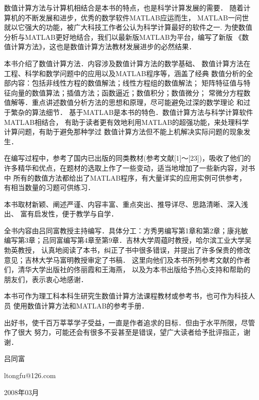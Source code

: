  \vspace*{0.0cm}
\thispagestyle{empty}
\vspace*{2.2cm}
\centerline{\hei{\color{darkblue}{第一版前言}}}\vspace{2cm}

数值计算方法与计算机相结合是本书的特点，也是科学计算发展的需要．
随着计算机的不断发展和进步，优秀的数学软件MATLAB应运而生，
MATLAB一问世就以它强大的功能，被广大科技工作者公认为科学计算最好的软件之一.
为使数值分析与MATLAB更好地结合，我们以最新版MATLAB为平台，编写了新版
《数值计算方法》，这也是数值计算方法教材发展进步的必然结果．

本书介绍了数值计算方法．内容涉及数值计算方法的数学基础、
数值计算方法在工程、科学和数学问题中的应用以及MATLAB程序等，涵盖了经典
数值分析的全部内容：包括非线性方程的数值解法；线性方程组的数值解法；
矩阵特征值与特征向量的数值算法；插值方法；函数逼近；数值积分；数值微分；
常微分方程数值解等．重点讲述数值分析方法的思想和原理，尽可能避免过深的数学理论
和过于繁杂的算法细节．
基于MATLAB是本书的特色．数值计算方法与科学计算软件MATLAB相结合，
有助于读者更有效地利用MATLAB的超强功能，来处理科学计算问题，有助于避免那种学过
数值计算方法但不能上机解决实际问题的现象发生．

在编写过程中，参考了国内已出版的同类教材(参考文献[1]～[23])，吸收了他们的
许多精华和优点，在题材的选取上作了一些变动，适当地增加了一些新内容，对书中
所有的数值方法都给出了MATLAB程序，有大量详实的应用实例可供参考，
有相当数量的习题可供练习．

本书取材新颖、阐述严谨、内容丰富、重点突出、推导详尽、思路清晰、深入浅出、
富有启发性，便于教学与自学．

全书内容由吕同富教授主持编写．具体分工：方秀男编写第1章和第2章；康兆敏
编写第3章；吕同富编写第4章至第9章．吉林大学周蕴时教授，哈尔滨工业大学吴勃英教授，
认真地阅读了本书，纠正了书中很多错误，并提出了许多保贵的修改意见；吉林大学马富明教授审定了书稿．
这里向他们及本书所列参考文献的作者们，清华大学出版社的佟丽霞和王海燕，
以及为本书出版给予热心支持和帮助的朋友们，表示衷心地感谢．

本书可作为理工科本科生研究生数值计算方法课程教材或参考书，也可作为科技人员
使用数值计算方法和MATLAB的参考手册．

出好书，使千百万莘莘学子受益，一直是作者追求的目标．但由于水平所限，尽管作了很大
努力，可能还会有很多不妥甚至是错误，望广大读者给予批评指正，谢谢．



\vspace{2cm}

\hfill 吕同富\hspace{0.2em}

\hfill ltongfu@126.com \hspace{0.2em}

\hfill 2008年03月\hspace{0.2em}
